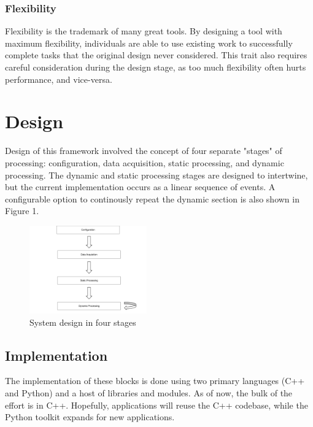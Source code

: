 \documentclass[journal]{IEEEtran}
\begin{document}
\subsubsection{Flexibility}
Flexibility is the trademark of many great tools. By designing a tool with maximum flexibility, individuals are able to use existing 
work to successfully complete tasks that the original design never considered. This trait also requires careful consideration during the design
stage, as too much flexibility often hurts performance, and vice-versa.

\section{Design}
Design of this framework involved the concept of four separate "stages" of processing: configuration, data acquisition, static processing, and 
dynamic processing. The dynamic and static processing stages are designed to intertwine, but the current implementation occurs as a 
linear sequence of events. A configurable option to continously repeat the dynamic section is also shown in Figure 1.
\begin{figure}[h!]
\centering
  \includegraphics[width=0.45\textwidth]{fig1.png}
\caption{System design in four stages}
\end{figure}

\subsection{Implementation}
The implementation of these blocks is done using two primary languages (C++ and Python) and a host of libraries and modules. As of now, the bulk
of the effort is in C++. Hopefully, applications will reuse the C++ codebase, while the Python toolkit expands for new applications.
\end{document}
